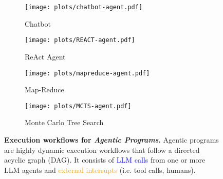 \begin{figure}[t]
\centering
\begin{subfigure}[b]{0.49\columnwidth}
    \texttt{[image: plots/chatbot-agent.pdf]}
    \caption{Chatbot}
    \label{fig:chatbot_agent}
\end{subfigure}
\hfill
\begin{subfigure}[b]{0.49\columnwidth}
    \texttt{[image: plots/REACT-agent.pdf]}
    \caption{ReAct Agent}
    \label{fig:react_agent}
\end{subfigure}
\hfill
\begin{subfigure}[b]{0.44\columnwidth}
    \texttt{[image: plots/mapreduce-agent.pdf]}
    \caption{Map-Reduce}
    \label{fig:map_reduce_agent}
\end{subfigure}
\hfill
\begin{subfigure}[b]{0.53\columnwidth}
    \texttt{[image: plots/MCTS-agent.pdf]}
    \caption{Monte Carlo Tree Search}
    \label{fig:mcts_agent}
\end{subfigure}
\caption{\small\textbf{Execution workflows for \textit{Agentic Programs}.} Agentic programs are highly dynamic execution workflows that follow a directed acyclic graph (DAG). It consists of \textcolor{blue}{LLM calls} from one or more LLM agents and \textcolor{orange}{external interrupts} (i.e. tool calls, humans).}
\label{fig:agentic_program}
\vspace{-5mm}
\end{figure}


